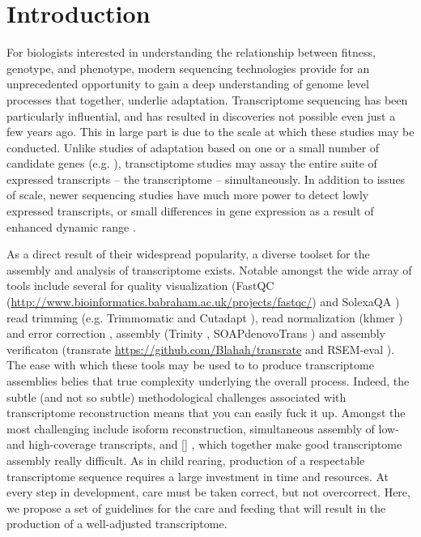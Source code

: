 \section*{Introduction}


For biologists interested in understanding the relationship between fitness, genotype, and phenotype, modern sequencing technologies provide for an unprecedented opportunity to gain a deep understanding of genome level processes that together, underlie adaptation. Transcriptome sequencing has been particularly influential, and has resulted in discoveries not possible even just a few years ago. This in large part is due to the scale at which these studies may be conducted. Unlike studies of adaptation based on one or a small number of candidate genes (e.g. \citep{Fitzpatrick:2005vd,Panhuis:2006kp}), transctiptome studies may assay the entire suite of expressed transcripts -- the transcriptome -- simultaneously. In addition to issues of scale, newer sequencing studies have much more power to detect lowly expressed transcripts, or small differences in gene expression as a result of enhanced dynamic range \citep{Wolf:2013hd,Vijay:2012gy}.

As a direct result of their widespread popularity, a diverse toolset for the assembly and analysis of transcriptome exists. Notable amongst the wide array of tools include several for quality visualization (FastQC (\url{http://www.bioinformatics.babraham.ac.uk/projects/fastqc/}) and SolexaQA \citep{Cox:2010ch}) read trimming (e.g. Trimmomatic \citep{Bolger:2014ek} and Cutadapt \citep{Martin:2011va}), read normalization (khmer \citep{Pell:2012id}) and error correction \citep{Le:2013dy}, assembly (Trinity \citep{Haas:2013jq}, SOAPdenovoTrans \citep{Xie:2013wu}) and assembly verificaton (transrate \url{https://github.com/Blahah/transrate} and RSEM-eval \citep{Li:2014er}). The ease with which these tools may be used to to produce transcriptome assemblies belies that true complexity underlying the overall process. Indeed, the subtle (and not so subtle) methodological challenges associated with transcriptome reconstruction means that you can easily fuck it up. Amongst the most challenging include isoform reconstruction, simultaneous assembly of low- and high-coverage transcripts, and [] \citep{Modrek:2001ud,Johnson:2003kh}, which together make good transcriptome assembly really difficult. As in child rearing, production of a respectable transcriptome sequence requires a large investment in time and resources. At every step in development, care must be taken correct, but not overcorrect. Here, we propose a set of guidelines for the care and feeding that will result in the production of a well-adjusted transcriptome. \\

